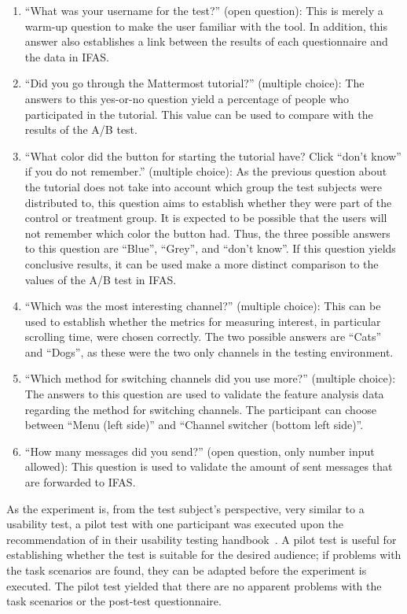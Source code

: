 \begin{description}
\begin{enumerate}
\item ``What was your username for the test?'' (open question):
This is merely a warm-up question to make the user familiar with the tool.
In addition, this answer also establishes a link between the results of each questionnaire and the data in \ac{IFAS}.
\item ``Did you go through the Mattermost tutorial?'' (multiple choice):
The answers to this yes-or-no question yield a percentage of people who participated in the tutorial.
This value can be used to compare with the results of the A/B test.
\item ``What color did the button for starting the tutorial have? Click ``don't know'' if you do not remember.'' (multiple choice):
As the previous question about the tutorial does not take into account which group the test subjects were distributed to, this question aims to establish whether they were part of the control or treatment group.
It is expected to be possible that the users will not remember which color the button had.
Thus, the three possible answers to this question are ``Blue'', ``Grey'', and ``don't know''.
If this question yields conclusive results, it can be used make a more distinct comparison to the values of the A/B test in \ac{IFAS}.
\item ``Which was the most interesting channel?'' (multiple choice):
This can be used to establish whether the metrics for measuring interest, in particular scrolling time, were chosen correctly.
The two possible answers are ``Cats'' and ``Dogs'', as these were the two only channels in the testing environment.
\item ``Which method for switching channels did you use more?'' (multiple choice):
The answers to this question are used to validate the feature analysis data regarding the method for switching channels.
The participant can choose between ``Menu (left side)'' and ``Channel switcher (bottom left side)''.
\item ``How many messages did you send?'' (open question, only number input allowed):
This question is used to validate the amount of sent messages that are forwarded to \ac{IFAS}.
\end{enumerate}

\end{description}

As the experiment is, from the test subject's perspective, very similar to a usability test, a pilot test with one participant was executed upon the recommendation of \citeauthor{rubin2008handbook} in their usability testing handbook~\cite{rubin2008handbook}.
A pilot test is useful for establishing whether the test is suitable for the desired audience; if problems with the task scenarios are found, they can be adapted before the experiment is executed.
The pilot test yielded that there are no apparent problems with the task scenarios or the post-test questionnaire.


